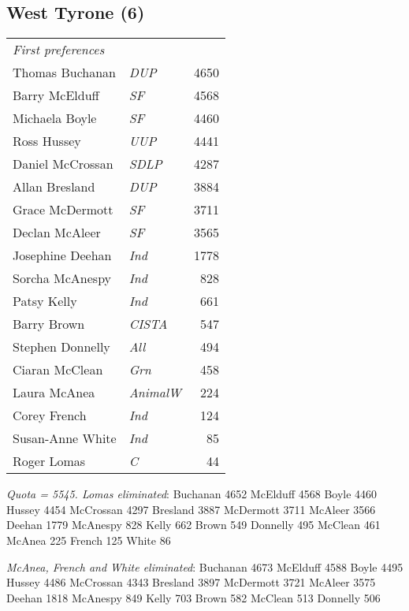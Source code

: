 \begin{resultsiii}
\end{resultsiii}\vfill\eject\begin{resultsiii}

\subsection*{West Tyrone (6)}


\noindent
\begin{tabular*}{\columnwidth}{@{\extracolsep{\fill}} p{} >{\itshape}l r @{\extracolsep{\fill}}}
	\emph{First preferences}\\
	Thomas Buchanan & DUP & 4650\\
	Barry McElduff & SF & 4568\\
	Michaela Boyle & SF & 4460\\
	Ross Hussey & UUP & 4441\\
	Daniel McCrossan & SDLP & 4287\\
	Allan Bresland & DUP & 3884\\
	Grace McDermott & SF & 3711\\
	Declan McAleer & SF & 3565\\
	Josephine Deehan & Ind & 1778\\
	Sorcha McAnespy & Ind & 828\\
	Patsy Kelly & Ind & 661\\
	Barry Brown & CISTA & 547\\
	Stephen Donnelly & All & 494\\
	Ciaran McClean & Grn & 458\\
	Laura McAnea & AnimalW & 224\\
	Corey French & Ind & 124\\
	Susan-Anne White & Ind & 85\\
	Roger Lomas & C & 44\\
\end{tabular*}

\emph{Quota = 5545.  Lomas eliminated}: Buchanan 4652 McElduff 4568 Boyle 4460 Hussey 4454 McCrossan 4297 Bresland 3887 McDermott 3711 McAleer 3566 Deehan 1779 McAnespy 828 Kelly 662 Brown 549 Donnelly 495 McClean 461 McAnea 225 French 125 White 86

\emph{McAnea, French and White eliminated}: Buchanan 4673 McElduff 4588 Boyle 4495 Hussey 4486 McCrossan 4343 Bresland 3897 McDermott 3721 McAleer 3575 Deehan 1818 McAnespy 849 Kelly 703 Brown 582 McClean 513 Donnelly 506 


\end{resultsiii}
